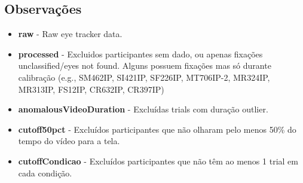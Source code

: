 \documentclass{article}
\begin{document}
\subsection{Observações}

\begin{itemize}
  \item \textbf{raw} - Raw eye tracker data. 
  \item \textbf{processed} - Excluidos participantes sem dado, ou apenas fixações unclassified/eyes not found. Alguns possuem fixações mas só durante calibração (e.g., SM462IP, SI421IP, SF226IP, MT706IP-2, MR324IP, MR313IP, FS12IP, CR632IP, CR397IP)
  \item \textbf{anomalousVideoDuration} - Excluídas trials com duração outlier.
  \item \textbf{cutoff50pct} - Excluídos participantes que não olharam pelo menos 50\% do tempo do vídeo para a tela.
  \item \textbf{cutoffCondicao} - Excluídos participantes que não têm ao menos 1 trial em cada condição.
\end{itemize}
\end{document}

